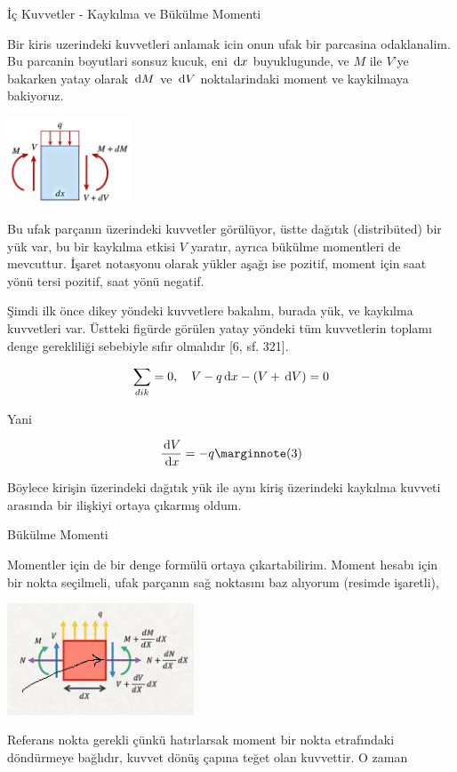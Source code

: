 \documentclass[12pt,fleqn]{article}\usepackage{../../common}
\begin{document}
İç Kuvvetler - Kaykılma ve Bükülme Momenti

Bir kiris uzerindeki kuvvetleri anlamak icin onun ufak bir parcasina
odaklanalim. Bu parcanin boyutlari sonsuz kucuk, eni $\,\mathrm{d} x$ buyuklugunde,
ve $M$ ile $V$'ye bakarken yatay olarak $\,\mathrm{d} M$ ve $\,\mathrm{d} V$ noktalarindaki
moment ve kaykilmaya bakiyoruz. 

\includegraphics[width=10em]{phy_020_strs_02_10.jpg}

Bu ufak parçanın üzerindeki kuvvetler görülüyor, üstte dağıtık (distribüted) bir
yük var, bu bir kaykılma etkisi $V$ yaratır, ayrıca bükülme momentleri de
mevcuttur. İşaret notasyonu olarak yükler aşağı ise pozitif, moment için
saat yönü tersi pozitif, saat yönü negatif.

Şimdi ilk önce dikey yöndeki kuvvetlere bakalım, burada yük, ve kaykılma
kuvvetleri var. Üstteki figürde görülen yatay yöndeki tüm kuvvetlerin toplamı
denge gerekliliği sebebiyle sıfır olmalıdır [6, sf. 321].

$$
\sum_{dik} = 0, \quad V - q \,\mathrm{d} x - (V + \,\mathrm{d} V) = 0
$$

Yani

$$
\frac{\ud V}{\ud x} = -q
\mlabel{3}
$$

Böylece kirişin üzerindeki dağıtık yük ile aynı kiriş üzerindeki kaykılma
kuvveti arasında bir ilişkiyi ortaya çıkarmış oldum. 

Bükülme Momenti

Momentler için de bir denge formülü ortaya çıkartabilirim. Moment hesabı için
bir nokta seçilmeli, ufak parçanın sağ noktasını baz alıyorum (resimde
işaretli),

\includegraphics[width=15em]{phy_020_strs_02_11.jpg}

Referans nokta gerekli çünkü hatırlarsak moment bir nokta etrafındaki
döndürmeye bağlıdır, kuvvet dönüş çapına teğet olan kuvvettir. O zaman 
\end{document}
